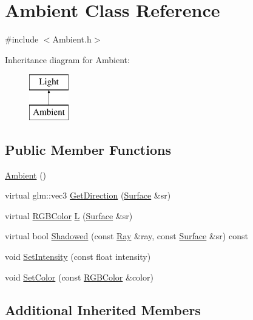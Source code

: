 \hypertarget{class_ambient}{}\section{Ambient Class Reference}
\label{class_ambient}


{\ttfamily \#include $<$Ambient.\+h$>$}

Inheritance diagram for Ambient\+:\begin{figure}[H]
\begin{center}
\leavevmode
\includegraphics[height=2.000000cm]{class_ambient}
\end{center}
\end{figure}
\subsection*{Public Member Functions}
\begin{DoxyCompactItemize}
\item 
\hyperlink{class_ambient_a022e0d891287bc9bfc67a72e72a601d8}{Ambient} ()
\item 
virtual glm\+::vec3 \hyperlink{class_ambient_acb2fc1574883ea0bd41c662ec904164f}{Get\+Direction} (\hyperlink{class_surface}{Surface} \&sr)
\item 
virtual \hyperlink{class_r_g_b_color}{R\+G\+B\+Color} \hyperlink{class_ambient_aa75478ba2b30c9930ef538dd16f4586a}{L} (\hyperlink{class_surface}{Surface} \&sr)
\item 
virtual bool \hyperlink{class_ambient_a1373251f8db560b10061eb23f125bb27}{Shadowed} (const \hyperlink{class_ray}{Ray} \&ray, const \hyperlink{class_surface}{Surface} \&sr) const
\item 
void \hyperlink{group___lights_ga5aefcac18f63a3923320e634daff4f57}{Set\+Intensity} (const float intensity)
\item 
void \hyperlink{group___lights_gaac238172e351af4e5b302b0a006bf719}{Set\+Color} (const \hyperlink{class_r_g_b_color}{R\+G\+B\+Color} \&color)
\end{DoxyCompactItemize}
\subsection*{Additional Inherited Members}


